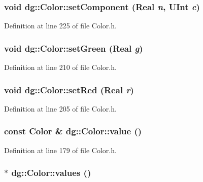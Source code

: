 \subsubsection{\setlength{\rightskip}{0pt plus 5cm}void dg::Color::set\-Component ({\bf Real} {\em n}, {\bf UInt} {\em c})\hspace{0.3cm}{\tt  [inline]}}\label{classdg_1_1Color_a24}




Definition at line 225 of file Color.h.
\subsubsection{\setlength{\rightskip}{0pt plus 5cm}void dg::Color::set\-Green ({\bf Real} {\em g})\hspace{0.3cm}{\tt  [inline]}}\label{classdg_1_1Color_a21}




Definition at line 210 of file Color.h.
\subsubsection{\setlength{\rightskip}{0pt plus 5cm}void dg::Color::set\-Red ({\bf Real} {\em r})\hspace{0.3cm}{\tt  [inline]}}\label{classdg_1_1Color_a20}




Definition at line 205 of file Color.h.
\subsubsection{\setlength{\rightskip}{0pt plus 5cm}const Color \& dg::Color::value ()\hspace{0.3cm}{\tt  [inline]}}\label{classdg_1_1Color_a16}




Definition at line 179 of file Color.h.
\subsubsection{ $\ast$ dg::Color::values ()\hspace{0.3cm}{\tt  [inline]}}\label{classdg_1_1Color_a17}




